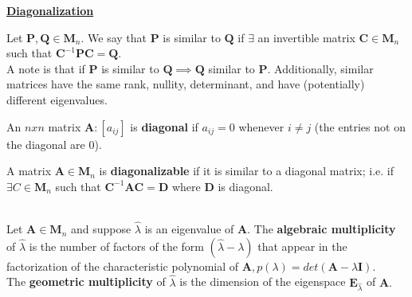 \documentclass{article}
\begin{document}
\underline{\textbf{Diagonalization}}
\begin{definition}
Let $\boldsymbol{P, Q} \in \boldsymbol{M}_n$. We say that $\boldsymbol{P}$ is similar to $\boldsymbol{Q}$ if $\exists$ an invertible matrix $\boldsymbol{C} \in \boldsymbol{M}_n$ such that $\boldsymbol{C}^{-1}\boldsymbol{P}\boldsymbol{C} = \boldsymbol{Q}.$ \\
A note is that if $\boldsymbol{P}$ is similar to $\boldsymbol{Q} \implies \boldsymbol{Q}$ similar to $\boldsymbol{P}.$ Additionally, similar matrices have the same rank, nullity, determinant, and have (potentially) different eigenvalues. 
\end{definition}

\begin{definition}
An $nxn$ matrix $\boldsymbol{A}: [a_{ij}]$ is \textbf{diagonal} if $a_{ij} = 0$ whenever $i \neq j$ (the entries not on the diagonal are $0$). 
\end{definition}
\begin{definition}
A matrix $\boldsymbol{A} \in \boldsymbol{M}_n$ is \textbf{diagonalizable} if it is similar to a diagonal matrix; i.e. if $\exists C \in \boldsymbol{M}_n$ such that $\boldsymbol{C}^{-1}\boldsymbol{AC} = \boldsymbol{D}$ where $\boldsymbol{D}$ is diagonal. \\ \\
\end{definition}

\begin{definition}
Let $\boldsymbol{A} \in \boldsymbol{M}_n$ and suppose $\hat{\lambda}$ is an eigenvalue of $\boldsymbol{A}.$ The \textbf{algebraic multiplicity} of $\hat{\lambda}$ is the number of factors of the form $(\hat{\lambda} - \lambda)$ that appear in the factorization of the characteristic polynomial of $\boldsymbol{A}, p(\lambda) = det(\boldsymbol{A} - \lambda\boldsymbol{I})$. \\

The \textbf{geometric multiplicity} of $\hat{\lambda}$ is the dimension of the eigenspace $\boldsymbol{E}_{\hat{\lambda}}$ of $\boldsymbol{A}.$
\end{definition}
\end{document}
